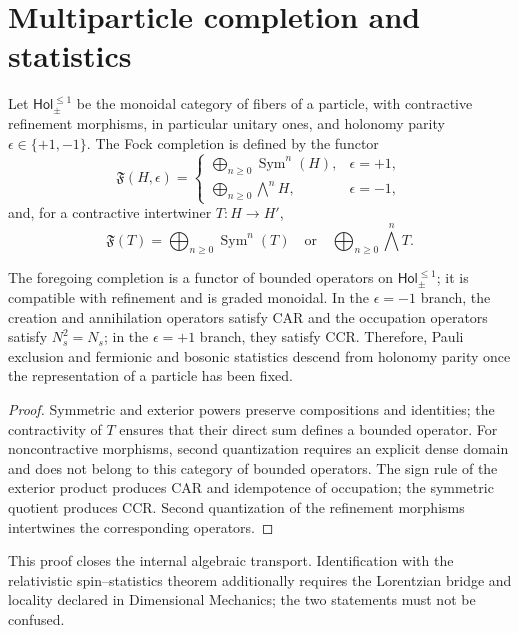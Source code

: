 \section{Multiparticle completion and statistics}

Let \(\mathsf{Hol}_{\pm}^{\leq1}\) be the monoidal category of fibers of a
particle, with contractive refinement morphisms, in particular unitary ones,
and holonomy parity
\(\epsilon\in\{+1,-1\}\). The Fock completion is defined by the functor
\[
 \mathfrak F(H,\epsilon)=
 \begin{cases}
 \displaystyle\bigoplus_{n\ge0}\operatorname{Sym}^n(H),
     &\epsilon=+1,\\[2mm]
 \displaystyle\bigoplus_{n\ge0}\bigwedge^n\!H,
     &\epsilon=-1,
 \end{cases}
\]
and, for a contractive intertwiner \(T:H\to H'\),
\[
 \mathfrak F(T)=
 \bigoplus_{n\ge0}\operatorname{Sym}^n(T)
 \quad\text{or}\quad
 \bigoplus_{n\ge0}\bigwedge^n\!T.
\]

\begin{theorem}
The foregoing completion is a functor of bounded operators on \(\mathsf{Hol}_{\pm}^{\leq1}\); it is compatible with refinement and is graded monoidal. In the \(\epsilon=-1\) branch, the creation and annihilation operators satisfy CAR and the occupation operators satisfy \(N_s^2=N_s\); in the \(\epsilon=+1\) branch, they satisfy CCR. Therefore, Pauli exclusion and fermionic and bosonic statistics descend from holonomy parity once the representation of a particle has been fixed.
\end{theorem}

\begin{proof}
Symmetric and exterior powers preserve compositions and identities; the contractivity of \(T\) ensures that their direct sum defines a bounded operator. For noncontractive morphisms, second quantization requires an explicit dense domain and does not belong to this category of bounded operators. The sign rule of the exterior product produces CAR and idempotence of occupation; the symmetric quotient produces CCR. Second quantization of the refinement morphisms intertwines the corresponding operators.
\end{proof}

This proof closes the internal algebraic transport. Identification
with the relativistic spin--statistics theorem additionally requires the
Lorentzian bridge and locality declared in Dimensional Mechanics; the two statements
must not be confused.

